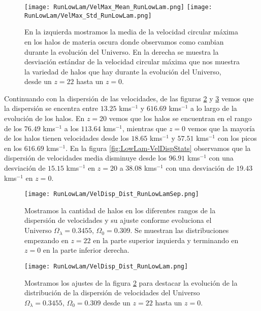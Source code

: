 \begin{figure}[H]
    \centering
    \texttt{[image: RunLowLam/VelMax\_Mean\_RunLowLam.png]}
    \texttt{[image: RunLowLam/VelMax\_Std\_RunLowLam.png]}
    \caption[Media y desviación estándar de la velocidad circular máxima]{\footnotesize En la izquierda mostramos la media de la velocidad circular máxima en los halos de materia oscura donde observamos como cambian durante la evolución del Universo. En la derecha se muestra la desviación estándar de la velocidad circular máxima que nos muestra la variedad de halos que hay durante la evolución del Universo, desde un $z=22$ hasta un $z=0$.}
    \label{fig:LowLam-VelMaxStats}
\end{figure}

Continuando con la dispersión de las velocidades, de las figuras \ref{fig:LowLam-VelDispDistSep} y \ref{fig:LowLam-VelDispDist} vemos que la dispersión se encentra entre $13.25$ kms$^{-1}$ y $616.69$ kms$^{-1}$ a lo largo de la evolución de los halos. En $z=20$ vemos que los halos se encuentran en el rango de los $76.49$ kms$^{-1}$ a los $113.64$ kms$^{-1}$, mientras que $z=0$ vemos que la mayoría de los halos tienen velocidades desde los $18.65$ kms$^{-1}$ y $57.51$ kms$^{-1}$ con los picos en los $616.69$ kms$^{-1}$. En la figura \ref{fig:LowLam-VelDispStats} observamos que la dispersión de velocidades media disminuye desde los $96.91$ kms$^{-1}$ con una desviación de $15.15$ kms$^{-1}$ en $z=20$ a $38.08$ kms$^{-1}$ con una desviación de $19.43$ kms$^{-1}$ en $z=0$.

\begin{figure}[H]
    \centering
    \texttt{[image: RunLowLam/VelDisp\_Dist\_RunLowLamSep.png]}
    \caption[Dispersión de velocidades]{\footnotesize Mostramos la cantidad de halos en los diferentes rangos de la dispersión de velocidades y su ajuste conforme evoluciona el Universo $\Omega_\lambda = 0.3455$, $\Omega_0 = 0.309$. Se muestran las distribuciones empezando en $z=22$ en la parte superior izquierda y terminando en $z=0$ en la parte inferior derecha.}
    \label{fig:LowLam-VelDispDistSep}
\end{figure}

\begin{figure}[H]
    \centering
    \texttt{[image: RunLowLam/VelDisp\_Dist\_RunLowLam.png]}
    \caption[Distribución de la dispersión de velocidades]{\footnotesize Mostramos los ajustes de la figura \ref{fig:LowLam-VelDispDistSep} para destacar la evolución de la distribución de la dispersión de velocidades del Universo $\Omega_\lambda = 0.3455$, $\Omega_0 = 0.309$ desde un $z=22$ hasta un $z=0$.}
    \label{fig:LowLam-VelDispDist}
\end{figure}

